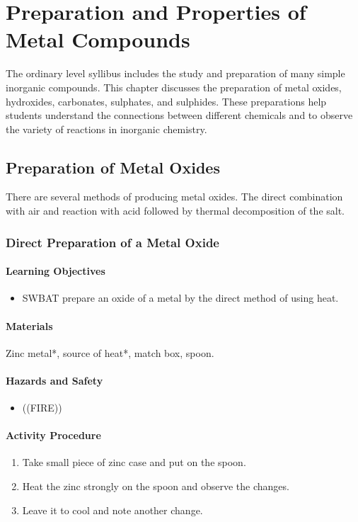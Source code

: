 \chapter{Preparation and Properties of Metal Compounds}

The ordinary level syllibus includes the study and preparation of many simple inorganic compounds. This chapter discusses the preparation of metal oxides, hydroxides, carbonates, sulphates, and sulphides. These preparations help students understand the connections between different chemicals and to observe the variety of reactions in inorganic chemistry.

\section{Preparation of Metal Oxides}

There are several methods of producing metal oxides. The direct combination with air and reaction with acid followed by thermal decomposition of the salt.

\subsection{Direct Preparation of a Metal Oxide}

\subsubsection*{Learning Objectives}
\begin{itemize}
\item{SWBAT prepare an oxide of a metal by the direct method of using heat.}
\end{itemize}

\subsubsection*{Materials}
Zinc metal*, source of heat*, match box, spoon.

\subsubsection*{Hazards and Safety}
\begin{itemize}
\item{((FIRE))}
\end{itemize}

\subsubsection*{Activity Procedure}
\begin{enumerate}
\item{Take small piece of zinc case and put on the spoon.}
\item{Heat the zinc strongly on the spoon and observe the changes.}
\item{Leave it to cool and note another change.}
\end{enumerate}

